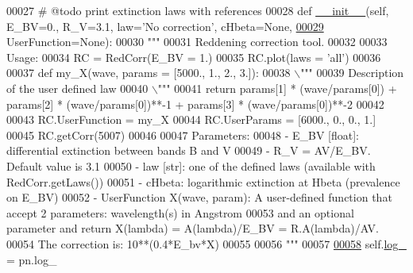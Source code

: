 \begin{DoxyCode}
00027     \textcolor{comment}{# @todo print extinction laws with references}
00028     \textcolor{keyword}{def }\hyperlink{classpyneb_1_1extinction_1_1red__corr_1_1_red_corr_a27b836e3bd87558f6156a8bf94fbf658}{\_\_init\_\_}(self, E\_BV=0., R\_V=3.1, law='No correction', cHbeta=None,
\hypertarget{red__corr_8py_source_l00029}{}\hyperlink{classpyneb_1_1extinction_1_1red__corr_1_1_red_corr_a27b836e3bd87558f6156a8bf94fbf658}{00029}                  UserFunction=\textcolor{keywordtype}{None}):
00030         \textcolor{stringliteral}{"""}
00031 \textcolor{stringliteral}{        Reddening correction tool.}
00032 \textcolor{stringliteral}{}
00033 \textcolor{stringliteral}{        Usage:}
00034 \textcolor{stringliteral}{            RC = RedCorr(E\_BV = 1.)}
00035 \textcolor{stringliteral}{            RC.plot(laws = 'all')}
00036 \textcolor{stringliteral}{}
00037 \textcolor{stringliteral}{            def my\_X(wave, params = [5000., 1., 2., 3.]):}
00038 \textcolor{stringliteral}{                \(\backslash\)"""}
00039 \textcolor{stringliteral}{                Description of the user defined law}
00040 \textcolor{stringliteral}{                \(\backslash\)"""}
00041 \textcolor{stringliteral}{                return params[1] * (wave/params[0]) + params[2] * (wave/params[0])**-1 + params[3] *
       (wave/params[0])**-2}
00042 \textcolor{stringliteral}{}
00043 \textcolor{stringliteral}{            RC.UserFunction = my\_X}
00044 \textcolor{stringliteral}{            RC.UserParams = [6000., 0., 0., 1.]}
00045 \textcolor{stringliteral}{            RC.getCorr(5007)}
00046 \textcolor{stringliteral}{        }
00047 \textcolor{stringliteral}{        Parameters:}
00048 \textcolor{stringliteral}{            - E\_BV [float]: differential extinction between bands B and V}
00049 \textcolor{stringliteral}{            - R\_V = AV/E\_BV. Default value is 3.1}
00050 \textcolor{stringliteral}{            - law [str]: one of the defined laws (available with RedCorr.getLaws()) }
00051 \textcolor{stringliteral}{            - cHbeta: logarithmic extinction at Hbeta (prevalence on E\_BV)}
00052 \textcolor{stringliteral}{            - UserFunction X(wave, param): A user-defined function that accept 2 parameters: wavelength(s)
       in Angstrom }
00053 \textcolor{stringliteral}{            and an optional parameter and return X(lambda) = A(lambda)/E\_BV = R.A(lambda)/AV. }
00054 \textcolor{stringliteral}{            The correction is: 10**(0.4*E\_bv*X)}
00055 \textcolor{stringliteral}{            }
00056 \textcolor{stringliteral}{        """}
00057         
\hypertarget{red__corr_8py_source_l00058}{}\hyperlink{classpyneb_1_1extinction_1_1red__corr_1_1_red_corr_a712aff76d06f15896ed30e689103f66d}{00058}         self.\hyperlink{classpyneb_1_1extinction_1_1red__corr_1_1_red_corr_a712aff76d06f15896ed30e689103f66d}{log\_} = pn.log\_ 

\end{DoxyCode}
